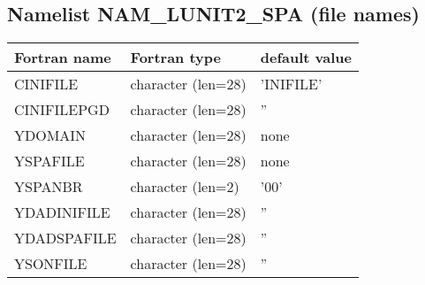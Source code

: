 \subsection{Namelist NAM\_LUNIT2\_SPA (file names)}

\begin{center}
\begin{tabular} {|l|l|l|}
\hline
Fortran name & Fortran type & default value\\
\hline
\hline
CINIFILE     & character (len=28)    & 'INIFILE'   \\
CINIFILEPGD  & character (len=28)    & ''   \\
YDOMAIN      & character (len=28)    & none  \\
YSPAFILE     & character (len=28)    & none \\
YSPANBR      & character (len=2)     & '00' \\
YDADINIFILE  & character (len=28)    & ''   \\
YDADSPAFILE  & character (len=28)    & ''   \\
YSONFILE     & character (len=28)    & ''   \\
\hline
\end{tabular}
\end{center}

